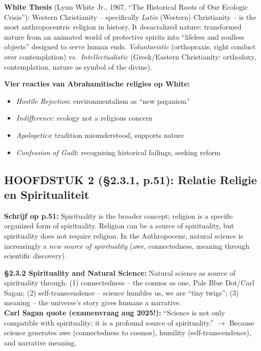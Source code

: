 \documentclass[a4paper,10pt]{article}
\begin{document}
\textbf{White Thesis} (Lynn White Jr., 1967, ``The Historical Roots of Our Ecologic Crisis''): Western Christianity -- specifically \textit{Latin} (Western) Christianity -- is the most anthropocentric religion in history. It desacralized nature: transformed nature from an animated world of protective spirits into ``lifeless and soulless objects'' designed to serve human ends. \textit{Voluntaristic} (orthopraxis, right conduct over contemplation) vs.\ \textit{Intellectualistic} (Greek/Eastern Christianity: orthodoxy, contemplation, nature as symbol of the divine).

\textbf{Vier reacties van Abrahamitische religies op White:}
\begin{itemize}[noitemsep]
  \item \textit{Hostile Rejection}: environmentalism as ``new paganism''
  \item \textit{Indifference}: ecology not a religious concern
  \item \textit{Apologetics}: tradition misunderstood, supports nature
  \item \textit{Confession of Guilt}: recognising historical failings, seeking reform
\end{itemize}

\vspace{3pt}

\subsection{HOOFDSTUK 2 (§2.3.1, p.51): Relatie Religie en Spiritualiteit}

\textbf{Schrijf op p.51:} Spirituality is the broader concept; religion is a specific organized form of spirituality. Religion can be a source of spirituality, but spirituality does not require religion. In the Anthropocene, natural science is increasingly a \textit{new source of spirituality} (awe, connectedness, meaning through scientific discovery).

\textbf{§2.3.2 Spirituality and Natural Science:} Natural science as source of spirituality through: (1) connectedness -- the cosmos as one, Pale Blue Dot/Carl Sagan; (2) self-transcendence -- science humbles us, we are ``tiny twigs''; (3) meaning -- the universe's story gives humans a narrative.\\
\textbf{Carl Sagan quote (examenvraag aug 2025!):} ``Science is not only compatible with spirituality; it is a profound source of spirituality.'' $\to$ Because science generates awe (connectedness to cosmos), humility (self-transcendence), and narrative meaning.
\end{document}
